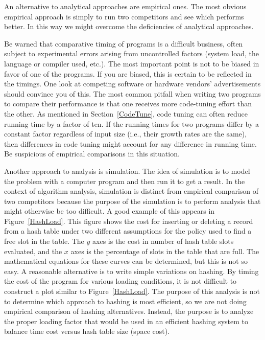 An alternative to analytical approaches are empirical ones.
The most obvious empirical approach is simply to run two competitors
and see which performs better.
In this way we might overcome the deficiencies of analytical approaches.

Be warned that comparative timing of programs is a difficult
business, often subject to experimental errors arising from
uncontrolled factors (system load, the language or
compiler used, etc.).
The most important point is not to be biased
in favor of one of the programs.
If you are biased, this is certain to be reflected in the timings.
One look at competing software or hardware vendors' advertisements
should convince you of this.
The most common pitfall when writing two programs to compare
their performance is that one receives more code-tuning effort than
the other.
As mentioned in Section~\ref{CodeTune}, code tuning can often reduce
running time by a factor of ten.
If the running times for two programs differ by a constant factor
regardless of input size (i.e., their growth rates are
the same), then differences in code tuning might account for any
difference in running time.
Be suspicious of empirical comparisons in this situation.

Another approach to analysis is simulation.
The idea of simulation is to model the problem with a computer program
and then run it to get a result.
In the context of algorithm analysis, simulation
is distinct from empirical comparison of two competitors because the
purpose of the simulation is to perform analysis that
might otherwise be too difficult.
A good example of this appears in Figure~\ref{HashLoad}.
This figure shows the cost for inserting or deleting a record from a
hash table under two different assumptions for the policy used to find
a free slot in the table.
The \(y\) axes is the cost in number of hash table slots evaluated,
and the \(x\) axes is the percentage of slots in the table that are
full.
The mathematical equations for these curves can be determined,
but this is not so easy.
A reasonable alternative is to write simple variations on hashing.
By timing the cost of the program for various loading conditions, it
is not difficult to construct a plot similar to Figure~\ref{HashLoad}.
The purpose of this analysis is not to determine which approach to
hashing is most efficient, so we are not doing empirical comparison of
hashing alternatives.
Instead, the purpose is to analyze the proper loading factor that
would be used in an efficient hashing system to balance time cost
versus hash table size (space cost).


